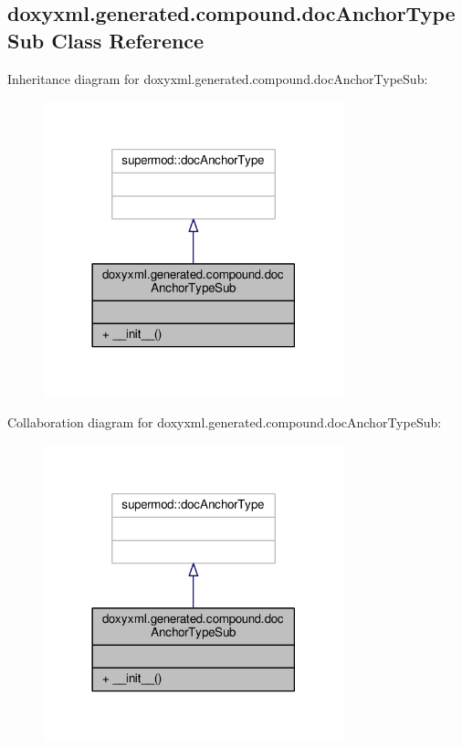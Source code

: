 \subsection{doxyxml.\+generated.\+compound.\+doc\+Anchor\+Type\+Sub Class Reference}
\label{classdoxyxml_1_1generated_1_1compound_1_1docAnchorTypeSub}


Inheritance diagram for doxyxml.\+generated.\+compound.\+doc\+Anchor\+Type\+Sub\+:
\nopagebreak
\begin{figure}[H]
\begin{center}
\leavevmode
\includegraphics[width=246pt]{d6/dab/classdoxyxml_1_1generated_1_1compound_1_1docAnchorTypeSub__inherit__graph}
\end{center}
\end{figure}


Collaboration diagram for doxyxml.\+generated.\+compound.\+doc\+Anchor\+Type\+Sub\+:
\nopagebreak
\begin{figure}[H]
\begin{center}
\leavevmode
\includegraphics[width=246pt]{d2/db0/classdoxyxml_1_1generated_1_1compound_1_1docAnchorTypeSub__coll__graph}
\end{center}
\end{figure}
